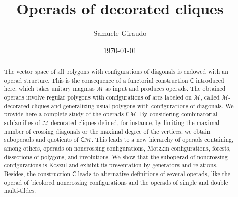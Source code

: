 \documentclass[10pt,reqno]{amsart}
\title{Operads of decorated cliques}
\date{\today}
\author{Samuele Giraudo}
\numberwithin{equation}{subsection}
\newcommand{\Mca}{\mathcal{M}}
\newcommand{\Cli}{\mathsf{C}}
\begin{document}
\begin{abstract}
    The vector space of all polygons with configurations of diagonals
    is endowed with an operad structure. This is the consequence of
    a functorial construction $\Cli$ introduced here, which takes
    unitary magmas $\Mca$ as input and produces operads. The obtained
    operads involve regular polygons with configurations of arcs labeled
    on $\Mca$, called $\Mca$-decorated cliques and generalizing usual
    polygons with configurations of diagonals. We provide here a
    complete study of the operads $\Cli\Mca$. By considering
    combinatorial subfamilies of $\Mca$-decorated cliques defined, for
    instance, by limiting the maximal number of crossing diagonals or
    the maximal degree of the vertices, we obtain suboperads and
    quotients of $\Cli\Mca$. This leads to a new hierarchy of operads
    containing, among others, operads on noncrossing configurations,
    Motzkin configurations, forests, dissections of polygons, and
    involutions. We show that the suboperad of noncrossing
    configurations is Koszul and exhibit its presentation by generators
    and relations. Besides, the construction $\Cli$ leads to alternative
    definitions of several operads, like the operad of bicolored
    noncrossing configurations and the operads of simple and double
    multi-tildes.
\end{abstract}

\maketitle
\vspace{-2.5em}

\begin{footnotesize}
\tableofcontents
\end{footnotesize}

\end{document}
